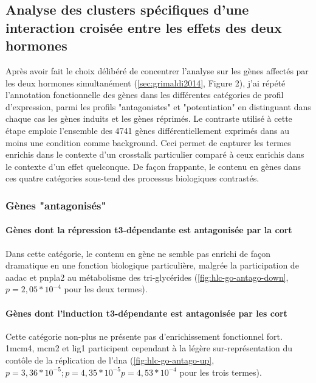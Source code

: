 \documentclass[../main.tex]{subfiles}
\begin{document}
\subsection{Analyse des clusters spécifiques d'une interaction croisée entre les effets des deux hormones}
Après avoir fait le choix délibéré de concentrer l'analyse sur les gènes affectés par les deux hormones simultanément (\autoref{sec:grimaldi2014}, Figure 2), j'ai répété l'annotation fonctionnelle des gènes dans les différentes catégories de profil d'expression, parmi les profils "antagonistes" et "potentiation" en distinguant dans chaque cas les gènes induits et les gènes réprimés.
Le contraste utilisé à cette étape emploie l'ensemble des 4741 gènes différentiellement exprimés dans au moins une condition comme background.
Ceci permet de capturer les termes enrichis dans le contexte d'un crosstalk particulier comparé à ceux enrichis dans le contexte d'un effet quelconque.
De façon frappante, le contenu en gènes dans ces quatre catégories sous-tend des processus biologiques contrastés.


\subsubsection{Gènes "antagonisés"}

\paragraph{Gènes dont la répression \gls{t3}-dépendante est antagonisée par la \gls{cort}}
Dans cette catégorie, le contenu en gène ne semble pas enrichi de façon dramatique en une fonction biologique particulière, malgrée la participation de \gls{aadac} et \gls{pnpla2} au métabolisme des tri-glycérides (\autoref{fig:hlc-go-antago-down}, $\textit{p} = 2,05 * 10^{-4}$ pour les deux termes).



\paragraph{Gènes dont l'induction \gls{t3}-dépendante est antagonisée par les \gls{cort}}
Cette catégorie non-plus ne présente pas d'enrichissement fonctionnel fort.
1\gls{mcm4}, \gls{mcm2} et \gls{lig1} participent cependant à la légère sur-représentation du contôle de la réplication de l'\gls{dna} (\autoref{fig:hlc-go-antago-up}, $\textit{p}=3,36*10^{-5}; \textit{p}=4,35*10^{-5}\textit{p}=4,53*10^{-4}$ pour les trois termes).
\end{document}
